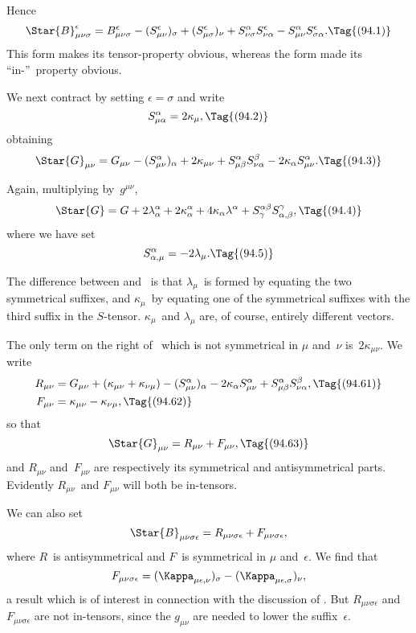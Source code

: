 \documentclass[12pt]{book}
\begin{document}
Hence
\[
\Star{B}_{\mu\nu\sigma}^{\epsilon}
= B_{\mu\nu\sigma}^{\epsilon} - (S_{\mu\nu}^{\epsilon})_{\sigma} + (S_{\mu\sigma}^{\epsilon})_{\nu}
+ S_{\nu\sigma}^{\alpha} S_{\nu\alpha}^{\epsilon} - S_{\mu\nu}^{\alpha} S_{\sigma\alpha}^{\epsilon}.
\Tag{(94.1)}
\]
This form makes its tensor\hyp{}property obvious, whereas the form  made its ``in-''~property obvious.

We next contract by setting $\epsilon = \sigma$ and write
\[
S_{\mu\alpha}^{\alpha} = 2\kappa_{\mu},
\Tag{(94.2)}
\]
obtaining
\[
\Star{G}_{\mu\nu} = G_{\mu\nu} - (S_{\mu\nu}^{\alpha})_{\alpha}
+ 2\kappa_{\mu\nu} + S_{\mu\beta}^{\alpha} S_{\nu\alpha}^{\beta}
- 2\kappa_{\alpha} S_{\mu\nu}^{\alpha}.
\Tag{(94.3)}
\]

Again, multiplying by~$g^{\mu\nu}$,
\[
\Star{G} = G + 2\lambda_{\alpha}^{\alpha} + 2\kappa_{\alpha}^{\alpha}
+ 4\kappa_{\alpha} \lambda^{\alpha} + S_{\gamma}^{\alpha\beta} S_{\alpha,\beta}^{\gamma},
\Tag{(94.4)}
\]
where we have set
\[
S_{\alpha,\mu}^{\alpha} = -2\lambda_{\mu}.
\Tag{(94.5)}
\]

The difference between  and~ is that $\lambda_{\mu}$~is formed by equating
the two symmetrical suffixes, and $\kappa_{\mu}$~by equating one of the symmetrical
suffixes with the third suffix in the $S$-tensor. $\kappa_{\mu}$~and $\lambda_{\mu}$ are, of course, entirely
different vectors.

The only term on the right of~ which is not symmetrical in $\mu$ and~$\nu$
is~$2\kappa_{\mu\nu}$. We write
\begin{align*}
  R_{\mu\nu} &= G_{\mu\nu} + (\kappa_{\mu\nu} + \kappa_{\nu\mu})
  - (S_{\mu\nu}^{\alpha})_{\alpha} - 2\kappa_{\alpha} S_{\mu\nu}^{\alpha}
  + S_{\mu\beta}^{\alpha} S_{\nu\alpha}^{\beta},
  \Tag{(94.61)} \\
  F_{\mu\nu} &= \kappa_{\mu\nu} - \kappa_{\nu\mu},
  \Tag{(94.62)}
\end{align*}
so that
\[
\Star{G}_{\mu\nu} = R_{\mu\nu} + F_{\mu\nu},
\Tag{(94.63)}
\]
and $R_{\mu\nu}$ and~$F_{\mu\nu}$ are respectively its symmetrical and antisymmetrical parts.
Evidently $R_{\mu\nu}$~and $F_{\mu\nu}$ will both be in\hyp{}tensors.

We can also set
\[
\Star{B}_{\mu\nu\sigma\epsilon} = R_{\mu\nu\sigma\epsilon} + F_{\mu\nu\sigma\epsilon},
\]
where $R$~is antisymmetrical and $F$~is symmetrical in $\mu$ and~$\epsilon$. We find that
%
\[
F_{\mu\nu\sigma\epsilon} = (\Kappa_{\mu\epsilon,\nu})_{\sigma} - (\Kappa_{\mu\epsilon,\sigma})_{\nu},
\]
a result which is of interest in connection with the discussion of . But
$R_{\mu\nu\sigma\epsilon}$ and $F_{\mu\nu\sigma\epsilon}$ are not in\hyp{}tensors, since the $g_{\mu\nu}$ are needed to lower the suffix~$\epsilon$.
\end{document}

